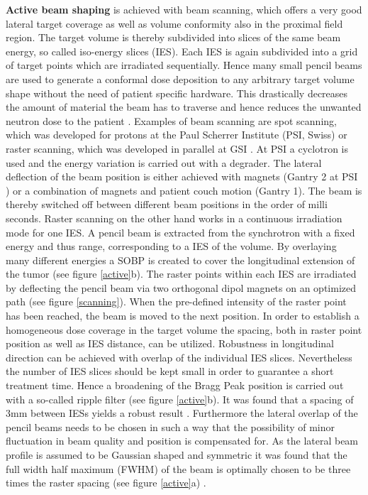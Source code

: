 \textbf{Active beam shaping} is achieved with beam scanning, which offers a very good lateral target coverage as well as volume conformity 
also in the proximal field region. The target volume is thereby subdivided into slices of the same beam energy, so called iso-energy slices 
(IES). Each IES is again subdivided into a grid of target points which are irradiated sequentially. Hence many small pencil beams are used to 
generate a conformal dose deposition to any arbitrary target volume shape without the need of patient specific hardware. This drastically 
decreases the amount of material the beam has to traverse and hence reduces the unwanted neutron dose to the patient \cite{Kad12}. Examples of 
beam scanning are spot scanning, which was developed for protons at the Paul Scherrer Institute (PSI, Swiss) \cite{Ped95} or raster scanning, 
which was developed in parallel at GSI \cite{Hab93}. \newline
\newline
At PSI a cyclotron is used and the energy variation is carried out with a degrader. The lateral deflection of the beam position is either 
achieved with magnets (Gantry 2 at PSI \cite{Ped04}) or a combination of magnets and patient couch motion (Gantry 1). The beam is thereby 
switched off between different beam positions in the order of milli seconds. \newline
\newline
Raster scanning on the other hand works in a continuous irradiation mode for one IES. A pencil beam is extracted from the synchrotron with a fixed energy and thus range, 
corresponding to a IES of the volume. By overlaying many different energies a SOBP is created to cover the longitudinal extension of the tumor 
(see figure \ref{active}b). The raster points within each IES are irradiated by deflecting the pencil beam via two orthogonal dipol magnets 
on an optimized path (see figure \ref{scanning}). When the pre-defined intensity of the raster point has been reached, the beam is moved to the next position. 
In order to establish a homogeneous dose coverage in the target volume the spacing, both in raster point position as well as IES distance, 
can be utilized. Robustness in longitudinal direction can be achieved with overlap of the individual IES slices. Nevertheless the number of 
IES slices should be kept small in order to guarantee a short treatment time. Hence a broadening of the Bragg Peak position is carried out 
with a so-called ripple filter (see figure \ref{active}b). It was found that a spacing of 3mm between IESs yields a robust result \cite{Web99}. 
Furthermore the lateral overlap of the pencil beams needs to be chosen in such a way that the possibility of minor fluctuation in beam 
quality and position is compensated for. As the lateral beam profile is assumed to be Gaussian shaped and symmetric it was found that the 
full width half maximum (FWHM) of the beam is optimally chosen to be three times the raster spacing (see figure \ref{active}a) \cite{Hab93}. 

